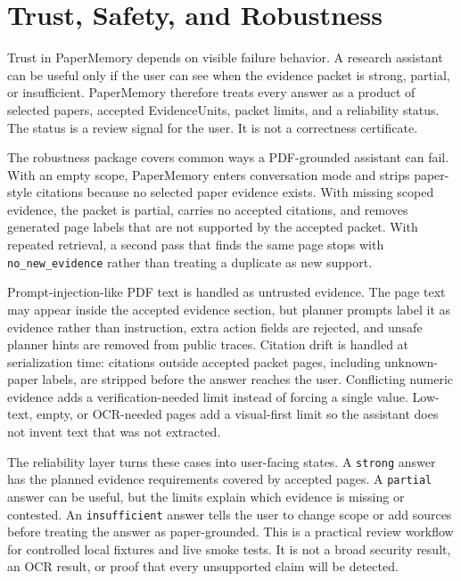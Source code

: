 \section{Trust, Safety, and Robustness}
\label{sec:trust-robustness}

Trust in PaperMemory depends on visible failure behavior. A research assistant can be useful only if the user can see when the evidence packet is strong, partial, or insufficient. PaperMemory therefore treats every answer as a product of selected papers, accepted EvidenceUnits, packet limits, and a reliability status. The status is a review signal for the user. It is not a correctness certificate.



The robustness package covers common ways a PDF-grounded assistant can fail. With an empty scope, PaperMemory enters conversation mode and strips paper-style citations because no selected paper evidence exists. With missing scoped evidence, the packet is partial, carries no accepted citations, and removes generated page labels that are not supported by the accepted packet. With repeated retrieval, a second pass that finds the same page stops with \texttt{no\_new\_evidence} rather than treating a duplicate as new support.

Prompt-injection-like PDF text is handled as untrusted evidence. The page text may appear inside the accepted evidence section, but planner prompts label it as evidence rather than instruction, extra action fields are rejected, and unsafe planner hints are removed from public traces. Citation drift is handled at serialization time: citations outside accepted packet pages, including unknown-paper labels, are stripped before the answer reaches the user. Conflicting numeric evidence adds a verification-needed limit instead of forcing a single value. Low-text, empty, or OCR-needed pages add a visual-first limit so the assistant does not invent text that was not extracted.

The reliability layer turns these cases into user-facing states. A \texttt{strong} answer has the planned evidence requirements covered by accepted pages. A \texttt{partial} answer can be useful, but the limits explain which evidence is missing or contested. An \texttt{insufficient} answer tells the user to change scope or add sources before treating the answer as paper-grounded. This is a practical review workflow for controlled local fixtures and live smoke tests. It is not a broad security result, an OCR result, or proof that every unsupported claim will be detected.


